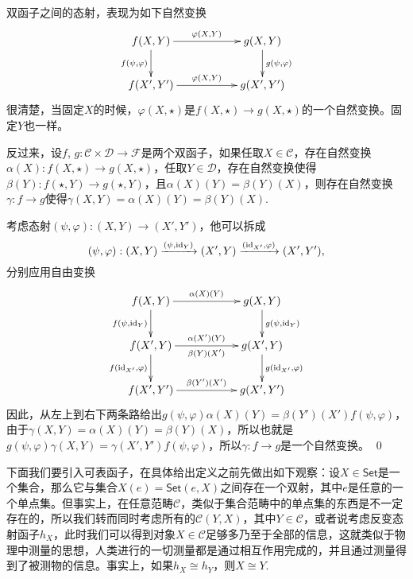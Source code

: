 \para 双函子之间的态射，表现为如下自然变换
\[
\begin{xy}
	\xymatrix{
		f(X,Y)\ar[rr]^{\varphi(X,Y)} \ar[d]_{f(\psi,\varphi)}&&g(X,Y) \ar[d]^{g(\psi,\varphi)}\\
		f(X',Y')\ar[rr]^{\varphi(X,Y)}&&g(X',Y')
	}
\end{xy}
\]
很清楚，当固定$X$的时候，$\varphi(X,\star)$是$f(X,\star)\to g(X,\star)$的一个自然变换。固定$Y$也一样。

反过来，设$f$, $g:\mathcal{C}\times \mathcal{D}\to \mathcal{F}$是两个双函子，如果任取$X\in \mathcal{C}$，存在自然变换$\alpha(X):f(X,\star)\to g(X,\star)$，任取$Y\in \mathcal{D}$，存在自然变换使得$\beta(Y):f(\star,Y)\to g(\star,Y)$，且$\alpha(X)(Y)=\beta(Y)(X)$，则存在自然变换$\gamma:f\to g$使得$\gamma(X,Y)=\alpha(X)(Y)=\beta(Y)(X)$.

\proof
	考虑态射$(\psi,\varphi):(X,Y)\to (X',Y')$，他可以拆成
	\[
		(\psi,\varphi): (X,Y) \xrightarrow{(\psi,\operatorname{id}_Y)} (X',Y)\xrightarrow{(\operatorname{id}_{X'},\varphi)} (X',Y'),
	\]
	分别应用自由变换
	\[
	\begin{xy}
		\xymatrix{
			f(X,Y)\ar[rr]^{\alpha(X)(Y)} \ar[d]_{f(\psi,\id_Y)}&&g(X,Y) \ar[d]^{g(\psi,\id_Y)}\\
			f(X',Y)\ar[rr]^{\alpha(X')(Y)}_{\beta(Y)(X')} \ar[d]_{f(\id_{X'},\varphi)}&&g(X',Y) \ar[d]^{g(\id_{X'},\varphi)}\\
			f(X',Y')\ar[rr]^{\beta(Y')(X')}&&g(X',Y')
		}
	\end{xy}
	\]
	因此，从左上到右下两条路给出$g(\psi,\varphi)\alpha(X)(Y)=\beta(Y')(X')f(\psi,\varphi)$，由于$\gamma(X,Y)=\alpha(X)(Y)=\beta(Y)(X)$，所以也就是$g(\psi,\varphi)\gamma(X,Y)=\gamma(X',Y')f(\psi,\varphi)$，所以$\gamma:f\to g$是一个自然变换。
\qed



\para 下面我们要引入可表函子，在具体给出定义之前先做出如下观察：设$X\in\mathsf{Set}$是一个集合，那么它与集合$X(e)={\mathsf{Set}}(e,X)$之间存在一个双射，其中$e$是任意的一个单点集。但事实上，在任意范畴$\mathcal{C}$，类似于集合范畴中的单点集的东西是不一定存在的，所以我们转而同时考虑所有的${\mathcal{C}}(Y,X)$，其中$Y\in \mathcal{C}$，或者说考虑反变态射函子$h_X$，此时我们可以得到对象$X\in \mathcal{C}$足够多乃至于全部的信息，这就类似于物理中测量的思想，人类进行的一切测量都是通过相互作用完成的，并且通过测量得到了被测物的信息。事实上，如果$h_X\cong h_Y$，则$X\cong Y$.

